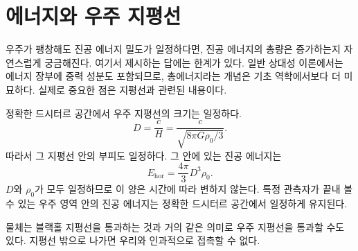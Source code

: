 \begin{classroomqa}
\end{classroomqa}

\section{에너지와 우주 지평선}

우주가 팽창해도 진공 에너지 밀도가 일정하다면, 진공 에너지의 총량은 증가하는지 자연스럽게 궁금해진다. 여기서 제시하는 답에는 한계가 있다. 일반 상대성 이론에서는 에너지 장부에 중력 성분도 포함되므로, 총에너지라는 개념은 기초 역학에서보다 더 미묘하다. 실제로 중요한 점은 지평선과 관련된 내용이다.

정확한 드시터르 공간에서 우주 지평선의 크기는 일정하다.
\begin{equation}
D=\frac{c}{H}
=\frac{c}{\sqrt{8\pi G\rho_0/3}}.
\end{equation}
따라서 그 지평선 안의 부피도 일정하다. 그 안에 있는 진공 에너지는
\begin{equation}
E_{\mathrm{hor}}=\frac{4\pi}{3}D^3\rho_0.
\end{equation}
\(D\)와 \(\rho_0\)가 모두 일정하므로 이 양은 시간에 따라 변하지 않는다. 특정 관측자가 끝내 볼 수 있는 우주 영역 안의 진공 에너지는 정확한 드시터르 공간에서 일정하게 유지된다.

물체는 블랙홀 지평선을 통과하는 것과 거의 같은 의미로 우주 지평선을 통과할 수도 있다. 지평선 밖으로 나가면 우리와 인과적으로 접촉할 수 없다.

\begin{classroomqa}
\end{classroomqa}

